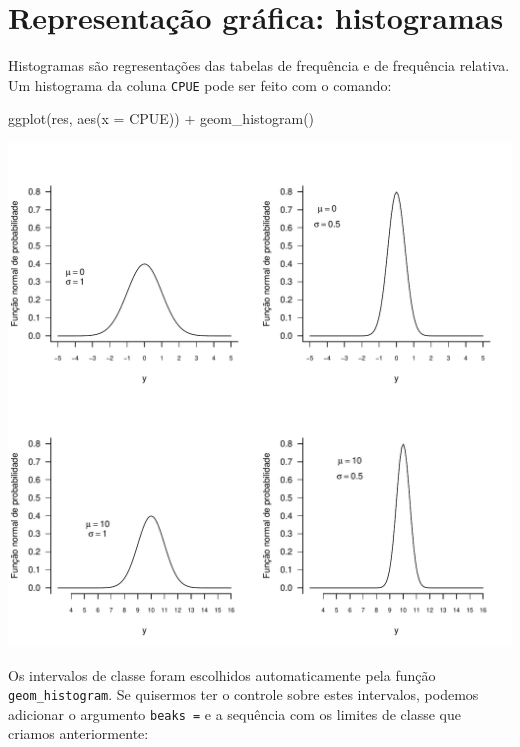 \documentclass[
]{book}
\newenvironment{Shaded}{\begin{snugshade}}{\end{snugshade}}
\newcommand{\AttributeTok}[1]{\textcolor[rgb]{0.77,0.63,0.00}{#1}}
\newcommand{\FunctionTok}[1]{\textcolor[rgb]{0.00,0.00,0.00}{#1}}
\newcommand{\NormalTok}[1]{#1}
\newcommand{\SpecialCharTok}[1]{\textcolor[rgb]{0.00,0.00,0.00}{#1}}
\begin{document}
\hypertarget{representauxe7uxe3o-gruxe1fica-histogramas}{%
\section{Representação gráfica: histogramas}\label{representauxe7uxe3o-gruxe1fica-histogramas}}

Histogramas são regresentações das tabelas de frequência e de frequência relativa. Um histograma da coluna \texttt{CPUE} pode ser feito com o comando:

\begin{Shaded}
\begin{Highlighting}[]
\FunctionTok{ggplot}\NormalTok{(res, }\FunctionTok{aes}\NormalTok{(}\AttributeTok{x =}\NormalTok{ CPUE)) }\SpecialCharTok{+}
  \FunctionTok{geom\_histogram}\NormalTok{()}
\end{Highlighting}
\end{Shaded}

\includegraphics{probest-cambientais_files/figure-latex/unnamed-chunk-108-1.pdf}

Os intervalos de classe foram escolhidos automaticamente pela função \texttt{geom\_histogram}. Se quisermos ter o controle sobre estes intervalos, podemos adicionar o argumento \texttt{beaks\ =} e a sequência com os limites de classe que criamos anteriormente:
\end{document}
